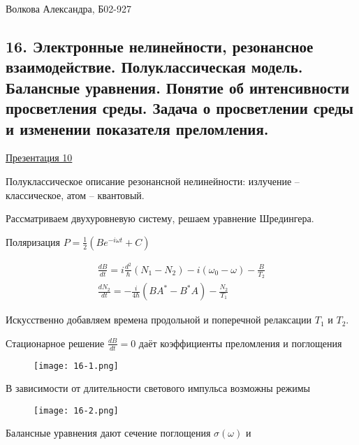 \documentclass[11 pt]{article}
\begin{document}
    \begin{flushright}
    {\Large Волкова Александра, Б02-927}
    \end{flushright}
    \hrulefill
    \linespread{1.2}

    \subsection*{16. Электронные нелинейности, резонансное взаимодействие. Полуклассическая модель. Балансные уравнения. Понятие об интенсивности просветления среды. Задача о просветлении среды и изменении показателя преломления.}

    \href{ https://docs.google.com/presentation/d/16hv_WdqqJShSlDdzsJv6v4AtQ_hLnpfM/edit#slide=id.p1}{Презентация 10}



    Полуклассическое описание резонансной нелинейности:
    излучение – классическое, атом – квантовый.

    Рассматриваем двухуровневую систему, решаем уравнение Шредингера.

    Поляризация $    P = \frac{1}{2} (B e^{-i \omega t } + C) $

    \begin{align}
        \frac{d B}{d t} = i \frac{d^2}{\hbar}(N_1 - N_2) - i (\omega_0 - \omega) - \frac{B}{T_2} \\
        \frac{d N_2}{d t} = - \frac{i}{4 \hbar} (BA^* - B^*A) - \frac{N_2}{T_1}
    \end{align}

    Искусственно добавляем времена продольной и поперечной релаксации $T_1$ и $T_2$.

    Стационарное решение $\frac{d B}{d t} = 0$ даёт коэффициенты преломления и поглощения

    \begin{figure}[h]
        \centering
        \texttt{[image: 16-1.png]}
        \label{fig:my_label}
    \end{figure}


    В зависимости от длительности светового импульса возможны режимы

    \begin{figure}[h]
        \centering
        \texttt{[image: 16-2.png]}
        \label{fig:my_label}
    \end{figure}

    Балансные уравнения дают сечение поглощения $\sigma(\omega)$ и
\end{document}
